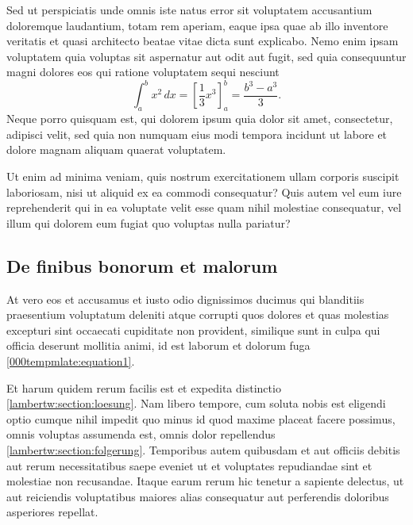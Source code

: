 Sed ut perspiciatis unde omnis iste natus error sit voluptatem
accusantium doloremque laudantium, totam rem aperiam, eaque ipsa
quae ab illo inventore veritatis et quasi architecto beatae vitae
dicta sunt explicabo.
Nemo enim ipsam voluptatem quia voluptas sit aspernatur aut odit
aut fugit, sed quia consequuntur magni dolores eos qui ratione
voluptatem sequi nesciunt
\begin{equation}
\int_a^b x^2\, dx
=
\left[ \frac13 x^3 \right]_a^b
=
\frac{b^3-a^3}3.
\label{lambertw:equation1}
\end{equation}
Neque porro quisquam est, qui dolorem ipsum quia dolor sit amet,
consectetur, adipisci velit, sed quia non numquam eius modi tempora
incidunt ut labore et dolore magnam aliquam quaerat voluptatem.

Ut enim ad minima veniam, quis nostrum exercitationem ullam corporis
suscipit laboriosam, nisi ut aliquid ex ea commodi consequatur?
Quis autem vel eum iure reprehenderit qui in ea voluptate velit
esse quam nihil molestiae consequatur, vel illum qui dolorem eum
fugiat quo voluptas nulla pariatur?

\subsection{De finibus bonorum et malorum
\label{lambertw:subsection:finibus}}
At vero eos et accusamus et iusto odio dignissimos ducimus qui
blanditiis praesentium voluptatum deleniti atque corrupti quos
dolores et quas molestias excepturi sint occaecati cupiditate non
provident, similique sunt in culpa qui officia deserunt mollitia
animi, id est laborum et dolorum fuga \eqref{000tempmlate:equation1}.

Et harum quidem rerum facilis est et expedita distinctio
\ref{lambertw:section:loesung}.
Nam libero tempore, cum soluta nobis est eligendi optio cumque nihil
impedit quo minus id quod maxime placeat facere possimus, omnis
voluptas assumenda est, omnis dolor repellendus
\ref{lambertw:section:folgerung}.
Temporibus autem quibusdam et aut officiis debitis aut rerum
necessitatibus saepe eveniet ut et voluptates repudiandae sint et
molestiae non recusandae.
Itaque earum rerum hic tenetur a sapiente delectus, ut aut reiciendis
voluptatibus maiores alias consequatur aut perferendis doloribus
asperiores repellat.


